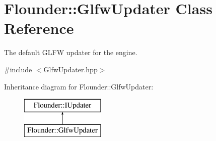 \hypertarget{class_flounder_1_1_glfw_updater}{}\section{Flounder\+:\+:Glfw\+Updater Class Reference}
\label{class_flounder_1_1_glfw_updater}


The default G\+L\+FW updater for the engine.  




{\ttfamily \#include $<$Glfw\+Updater.\+hpp$>$}

Inheritance diagram for Flounder\+:\+:Glfw\+Updater\+:\begin{figure}[H]
\begin{center}
\leavevmode
\includegraphics[height=2.000000cm]{class_flounder_1_1_glfw_updater}
\end{center}
\end{figure}
